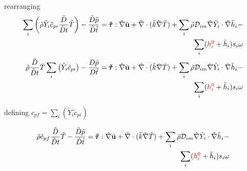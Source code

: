 \documentclass[preprint,12pt,authoryear]{elsarticle}
\begin{document}
rearranging
\begin{equation}
\begin{split}
        \sum\limits_i
        \left(
                \tilde{\rho}
                \tilde{Y}_i
                \tilde{c}_{pi}
                \frac{\tilde{D}}{\tilde{D} t}
                \tilde{T}
        \right)
        -
        \frac{\tilde{D} \tilde{p}}{\tilde{D}\tilde{t}}
        =
        \pmb{\tilde{\tau}}:\tilde{\nabla} \tilde{\mathbf{u}} 
        + 
        \tilde{\nabla} \cdot (\tilde{k}\tilde{\nabla} \tilde{T})
        +
        \sum\limits_i 
        \tilde{\rho}
        \mathcal{D}_{im}
        \tilde{\nabla}
        \tilde{Y}_i     
        \cdot
        \tilde{\nabla} 
        \tilde{h}_i
	-
\\
        \sum\limits_i
        ({\color{red} h_i^0} +\tilde{h}_i)
        s_i \omega
\\
        \tilde{\rho}
        \frac{\tilde{D}}{\tilde{D} t}
        \tilde{T}
        \sum\limits_i
        \left(
                \tilde{Y}_i
                \tilde{c}_{pi}
        \right)
        -
        \frac{D \tilde{p}}{D\tilde{t}}
        =
        \pmb{\tilde{\tau}}:\tilde{\nabla} \tilde{\mathbf{u}} 
        + 
        \tilde{\nabla} \cdot (\tilde{k}\tilde{\nabla} \tilde{T})
        +
        \sum\limits_i 
        \tilde{\rho}
        \mathcal{D}_{im}
        \tilde{\nabla}
        \tilde{Y}_i     
        \cdot
        \tilde{\nabla} 
        \tilde{h}_i
	-
\\	
        \sum\limits_i
        ({\color{red} h_i^0} + \tilde{h}_i)
        s_i \omega	
\end{split}
\end{equation}

defining 
$
{c}_{pf}
=
\sum\limits_i
\left(
        \tilde{Y}_i
        \tilde{c}_{pi}
\right)
$

\begin{equation}
\begin{split}
        \tilde{\rho}
        \tilde{c}_{pf}
        \frac{\tilde{D}}{\tilde{D} t}
        \tilde{T}
        -
        \frac{\tilde{D} \tilde{p}}{\tilde{D}\tilde{t}}
        =
        \pmb{\tilde{\tau}}:\tilde{\nabla} \tilde{\mathbf{u}} 
        + 
        \tilde{\nabla} \cdot (\tilde{k}\tilde{\nabla} \tilde{T})
        +
        \sum\limits_i 
        \tilde{\rho}
        \mathcal{D}_{im}
        \tilde{\nabla}
        \tilde{Y}_i     
        \cdot
        \tilde{\nabla} 
        \tilde{h}_i
	-
\\
        \sum\limits_i
        ({\color{red} h_i^0} + \tilde{h}_i)
        s_i	
        \omega
\end{split}
\end{equation}
\end{document}
